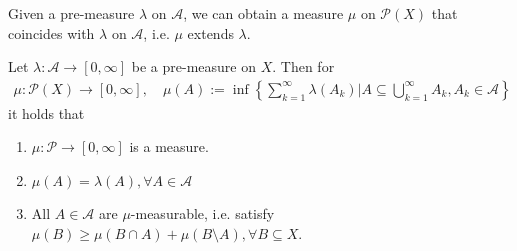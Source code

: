 Given a pre-measure $\lambda$ on $\mathcal{A}$, we can obtain a measure $\mu$ on $\mathcal{P}(X)$ that coincides with $\lambda$ on $\mathcal{A}$, i.e. $\mu$ extends $\lambda$.
\begin{thm}
  Let $\lambda: \mathcal{A} \to [0,\infty]$ be a pre-measure on $X$. Then for
  \begin{align*}
    \mu: \mathcal{P}(X) \to [0,\infty],\quad \mu(A) := \inf \left\{
      \sum_{k=1}^{\infty} \lambda(A_k) \big\vert A \subseteq \bigcup_{k=1}^{\infty}A_k, A_k \in \mathcal{A}
    \right\}
  \end{align*}
  it holds that
  \begin{enumerate}
    \item $\mu: \mathcal{P} \to [0,\infty]$ is a measure.
    \item $\mu(A) = \lambda(A), \forall A \in \mathcal{A}$
    \item All $A \in \mathcal{A}$ are $\mu$-measurable, i.e. satisfy $\mu(B) \geq \mu(B \cap A) + \mu(B \setminus A), \forall B \subseteq X$.
  \end{enumerate}
\end{thm}
